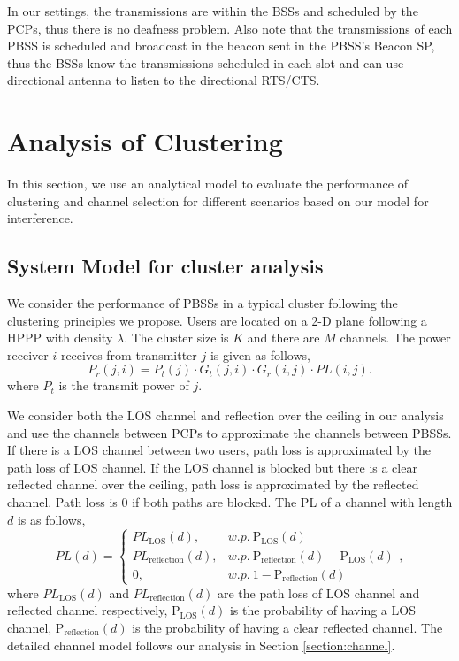 \documentclass[10pt, conference, letterpaper]{IEEEtran}
\DeclareMathOperator*{\LOS}{\mathrm{LOS}}
\begin{document}
In our settings, the transmissions are within the BSSs and scheduled by the PCPs, thus there is no deafness problem. Also note that the transmissions of each PBSS is scheduled and broadcast in the beacon sent in the PBSS's Beacon SP, thus the BSSs know the transmissions scheduled in each slot and can use directional antenna to listen to the directional RTS/CTS. 


\section{Analysis of Clustering}\label{section:clusteranalysis}
In this section, we use an analytical model to evaluate the performance of clustering and channel selection for different scenarios based on our model for interference.

\subsection{System Model for cluster analysis}
We consider the performance of PBSSs in a typical cluster following the clustering principles we propose. Users are located on a 2-D plane following a HPPP with density $\lambda$. The cluster size is $K$ and there are $M$ channels. 
The power receiver $i$ receives from transmitter $j$ is given as follows, 
\begin{equation*}
P_r(j,i) = P_t(j)\cdot G_t(j,i) \cdot G_r(i,j) \cdot PL(i,j).
\end{equation*} 
where $P_t$ is the transmit power of $j$.

We consider both the LOS channel and reflection over the ceiling in our analysis and use the channels between PCPs to approximate the channels between PBSSs. If there is a LOS channel between two users, path loss is approximated by the path loss of LOS channel. If the LOS channel is blocked but there is a clear reflected channel over the ceiling, path loss is approximated by the reflected channel. Path loss is 0 if both paths are blocked.
The PL of a channel with length $d$ is as follows, 
\begin{equation*}
PL(d) = 
\begin{cases}
PL_{\LOS}(d), & w.p. ~ \mathrm{P_{LOS}}(d)\\
PL_{\mathrm{reflection}}(d), & w.p. ~ \mathrm{P_{reflection}}(d) - \mathrm{P_{LOS}}(d) \\
0, & w.p. ~ 1-\mathrm{P_{reflection}}(d)
\end{cases},
\end{equation*}
where $PL_{\LOS}(d)$ and $PL_{\mathrm{reflection}}(d)$ are the path loss of LOS channel and reflected channel respectively, $\mathrm{P_{LOS}}(d)$ is the probability of having a LOS channel, $\mathrm{P_{reflection}}(d)$ is the probability of having a clear reflected channel. The detailed channel model follows our analysis in Section \ref{section:channel}. 
\end{document}
